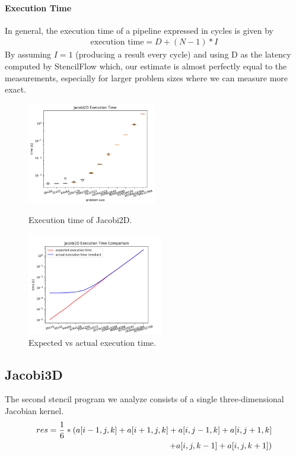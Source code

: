 \paragraph{Execution Time}

In general, the execution time of a pipeline expressed in cycles is given by
\begin{align}
\text{execution time} = D + (N-1)*I
\end{align}
By assuming $I=1$  (producing a result every cycle) and using D as the latency computed by StencilFlow which, our estimate is almost perfectly equal to the measurements, especially for larger problem sizes where we can measure more exact.
\begin{figure}[h]
	\begin{minipage}{.5\columnwidth}
		\centering
		\includegraphics[height=12em]{plots/jacobi2d_execution_time.png}
		\caption{Execution time of Jacobi2D.}
		\label{fig:jacobi2d_execution_time}
	\end{minipage}
	\begin{minipage}{.5\columnwidth}
		\centering
		\includegraphics[height=12em]{plots/jacobi2d_execution_time_comparison.png}
		\caption{Expected vs actual execution time.}
		\label{fig:jacobi2d_execution_time}
	\end{minipage}
\end{figure}


\subsection{Jacobi3D} 
The second stencil program we analyze consists of a single three-dimensional Jacobian kernel.
\begin{align}     
res = \frac{1}{6} * (a[i-1,j,k] + a[i+1,j,k] + a[i,j-1,k] + a[i,j+1,k] \notag \\
+ a[i,j,k-1] + a[i,j,k+1])
\end{align}



